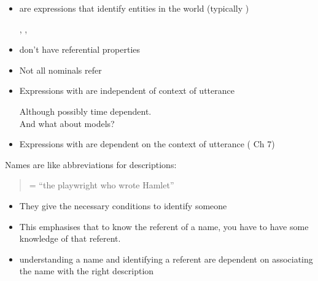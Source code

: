 \documentclass[headrule,footrule]{foils}
\begin{document}

\begin{itemize}
\item {} are expressions that identify
  entities in the world (typically )
  \begin{exe}
    \ex {}, 
    \ex {}, 
  \end{exe}
\item {} don’t have referential properties
  \begin{exe}
    \ex {}
  \end{exe}
\item Not all nominals refer
  \begin{exe}
    \ex {}
    \ex {}
  \end{exe} 
\end{itemize}

\begin{itemize}
\item Expressions with  are independent of context of utterance
  \begin{exe}
    \ex {}
  \end{exe}
  Although possibly time dependent.  
\\ And what about models?
\item Expressions with  are dependent on the
  context of utterance ( Ch 7)
  \begin{exe}
    \ex  {}
  \end{exe}
\end{itemize}


Names are like abbreviations for descriptions:

\begin{quote}
   = ``the playwright who wrote Hamlet''  
\end{quote}


\begin{itemize}
\item They give the necessary conditions to identify someone
\item This emphasises that to know the referent of a name, you have to have
some knowledge of that referent.
\item understanding a name and identifying a referent are dependent on associating the name with the right description
\end{itemize}
\end{document}
